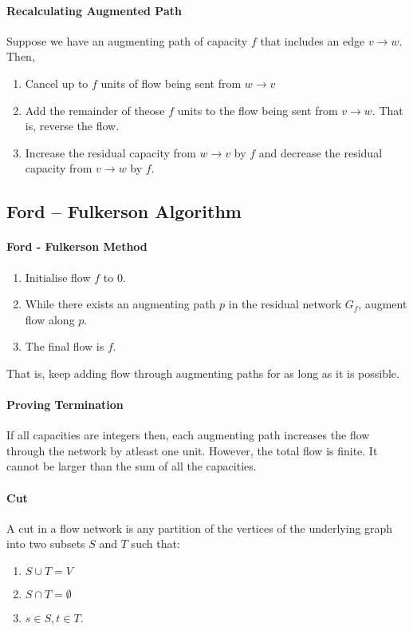 \paragraph{Recalculating Augmented Path}
Suppose we have an augmenting path of capacity \( f \)
that includes an edge  \( v \to  w \). Then,
\begin{enumerate}
  \item Cancel up to \( f \) units of flow being sent from  \( w \to  v \)
  \item Add the remainder of theose \( f \) units to the flow being sent
    from  \( v \to  w \). That is, reverse the flow.
  \item Increase the residual capacity from \( w \to  v \) by \( f \)
    and decrease the residual capacity from  \( v \to  w \) by \( f \).
\end{enumerate}

\subsection{Ford – Fulkerson Algorithm}

\paragraph{Ford - Fulkerson Method}
\begin{enumerate}
  \item Initialise flow \( f \) to  \( 0 \).
  \item While there exists an augmenting path  \( p \) in the residual
    network  \( G_f \), augment flow along  \( p \).
  \item The final flow is  \( f \).
\end{enumerate}
That is, keep adding flow through augmenting paths for as long as it is possible.

\paragraph{Proving Termination}
If all capacities are integers then, each augmenting path increases the flow
through the network by atleast one unit. However, the total flow is finite.
It cannot be larger than the sum of all the capacities.

\paragraph{Cut}
A cut in a flow network is any partition of the vertices of the underlying
graph into two subsets \( S \) and  \( T \) such that: 
\begin{enumerate}
  \item \( S \cup T = V \)
  \item \( S \cap T = \emptyset \)
  \item \( s \in S, t \in T \).
\end{enumerate}

